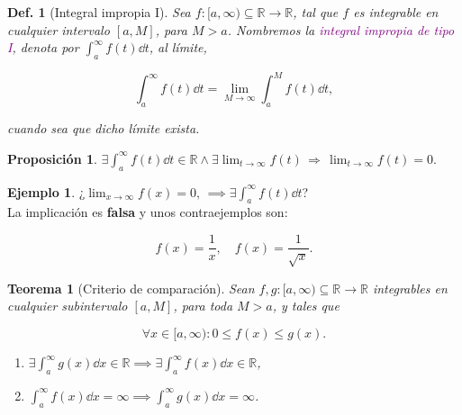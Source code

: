 \documentclass{article}
\theoremstyle{definicion}
\newtheorem{definicion}{Def.}
\theoremstyle{definition}             %
\theoremstyle{definition}             %
\theoremstyle{definition}
\theoremstyle{definition}
\theoremstyle{observacion}
\theoremstyle{definition}
\newtheorem{prop}{Proposición}
\theoremstyle{plain}
\newtheorem{theorem}{Teorema}
\theoremstyle{definition}
\newtheorem{exe}{Ejemplo}
\theoremstyle{afirmacion}
\theoremstyle{definition}
\begin{document}
    \begin{definicion}[Integral impropia I]
        Sea \(f\colon [a,\infty)\subseteq \mathbb{R}\to\mathbb{R}\), tal que \(f\) es integrable en cualquier intervalo \([a, M]\), para \(M > a\). Nombremos la \textcolor{purple}{integral impropia de tipo I}, denota por \(\int_{a}^{\infty}f(t)\dd{t}\), al límite,

        \begin{equation*}
            \int_{a}^{\infty}f(t)\dd{t} = \lim_{M \to \infty} \int_{a}^{M}f(t)\dd{t},
        \end{equation*}

        cuando sea que dicho límite exista.
    \end{definicion}

    \begin{prop}
        \(\exists \int_{a}^{\infty}f(t)\dd{t}\in\mathbb{R} \wedge \exists \lim_{t\to\infty}f(t)\, \Rightarrow\, \lim_{t \to \infty} f(t) = 0\).
    \end{prop}

    \begin{exe}
        ¿\(\lim_{x\to\infty}f(x) = 0,\, \implies \exists \int_{a}^{\infty}f(t)\dd{t}\)?\\
        La implicación es \textbf{falsa} y unos contraejemplos son:

        \begin{equation*}
            f(x) = \dfrac{1}{x},\quad f(x) = \dfrac{1}{\sqrt{x}}.
        \end{equation*}
    \end{exe}

    \begin{theorem}[Criterio de comparación]
        Sean \(f,g \colon [a,\infty)\subseteq \mathbb{R} \to \mathbb{R}\) integrables en cualquier subintervalo \([a,M]\), para toda \(M > a\), y tales que 

        \begin{equation*}
            \forall x\in [a,\infty)\colon 0 \leq f(x) \leq g(x).
        \end{equation*}

        \begin{enumerate}
            \item \(\exists \int_{a}^{\infty}g(x)\dd{x}\in\mathbb{R} \implies \exists \int_{a}^{\infty}f(x)\dd{x}\in\mathbb{R}\),
            \item \(\int_{a}^{\infty}f(x)\dd{x} = \infty \implies \int_{a}^{\infty}g(x)\dd{x} = \infty\).
        \end{enumerate}
    \end{theorem}
\end{document}
